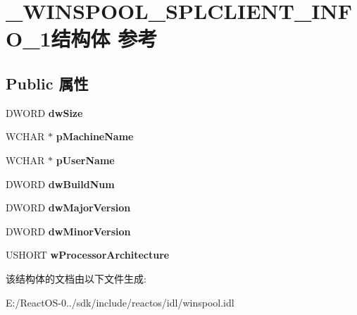 \hypertarget{struct___w_i_n_s_p_o_o_l___s_p_l_c_l_i_e_n_t___i_n_f_o__1}{}\section{\+\_\+\+W\+I\+N\+S\+P\+O\+O\+L\+\_\+\+S\+P\+L\+C\+L\+I\+E\+N\+T\+\_\+\+I\+N\+F\+O\+\_\+1结构体 参考}
\label{struct___w_i_n_s_p_o_o_l___s_p_l_c_l_i_e_n_t___i_n_f_o__1}
\subsection*{Public 属性}
\begin{DoxyCompactItemize}
\item 
\mbox{\label{struct___w_i_n_s_p_o_o_l___s_p_l_c_l_i_e_n_t___i_n_f_o__1_a80d8bc671dfb6b7e37128081c0c6840c}} 
D\+W\+O\+RD {\bfseries dw\+Size}
\item 
\mbox{\label{struct___w_i_n_s_p_o_o_l___s_p_l_c_l_i_e_n_t___i_n_f_o__1_a14247963e2de37f1a1c4cd4097da5c68}} 
W\+C\+H\+AR $\ast$ {\bfseries p\+Machine\+Name}
\item 
\mbox{\label{struct___w_i_n_s_p_o_o_l___s_p_l_c_l_i_e_n_t___i_n_f_o__1_a7ca006e912fe9444425ad8827fbbb7b3}} 
W\+C\+H\+AR $\ast$ {\bfseries p\+User\+Name}
\item 
\mbox{\label{struct___w_i_n_s_p_o_o_l___s_p_l_c_l_i_e_n_t___i_n_f_o__1_ae3714a554c732007288ea74a36f7455e}} 
D\+W\+O\+RD {\bfseries dw\+Build\+Num}
\item 
\mbox{\label{struct___w_i_n_s_p_o_o_l___s_p_l_c_l_i_e_n_t___i_n_f_o__1_a13874c77f8688b82583506f020d2b667}} 
D\+W\+O\+RD {\bfseries dw\+Major\+Version}
\item 
\mbox{\label{struct___w_i_n_s_p_o_o_l___s_p_l_c_l_i_e_n_t___i_n_f_o__1_a9ab64ca80dde7a4f9447e9509377ae04}} 
D\+W\+O\+RD {\bfseries dw\+Minor\+Version}
\item 
\mbox{\label{struct___w_i_n_s_p_o_o_l___s_p_l_c_l_i_e_n_t___i_n_f_o__1_a50628c02c6959cf79a539bae1a5a9f9b}} 
U\+S\+H\+O\+RT {\bfseries w\+Processor\+Architecture}
\end{DoxyCompactItemize}


该结构体的文档由以下文件生成\+:\begin{DoxyCompactItemize}
\item 
E\+:/\+React\+O\+S-\/0../sdk/include/reactos/idl/winspool.\+idl\end{DoxyCompactItemize}

